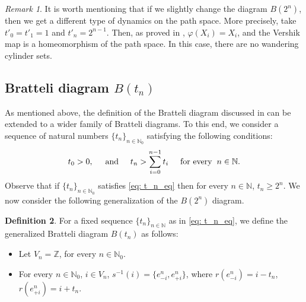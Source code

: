 \documentclass[11pt,reqno]{amsart}
\theoremstyle{definition}
\newtheorem{definition}{Definition}[section]
\theoremstyle{remark}
\newtheorem{remark}[definition]{Remark}
\theoremstyle{plain}
\newcommand{\N}{\mathbb N}
\newcommand{\Z}{\mathbb Z}
\numberwithin{equation}{section}
\begin{document}
\begin{remark} It is worth mentioning that if we slightly change 
the diagram $B(2^n)$, then we get a different type of dynamics on the path space. More precisely, take $t'_0 = t'_1 =1$ and $t'_n = 2^{n-1}$. Then, as proved in 
 \cite[Example 3.13]{BezuglyiJorgensenKarpelSanadhya2025}, $\varphi(X_i) = X_i$, and the Vershik map is a homeomorphism of the path space. In this case, there are no wandering cylinder sets. 
\end{remark}

\subsection{Bratteli diagram $B(t_n)$}

As mentioned above, the definition of the Bratteli diagram discussed in   can be extended to a wider family
of Bratteli diagrams. To this end, we consider a sequence of natural numbers $\{t_{n}\}_{n\in \N_0}$ satisfying the following conditions:
\begin{equation}\label{eq: t_n_eq}
    t_0 >0,\hspace{5mm} \mathrm{and} \hspace{5mm} t_n > \sum_{i=0}^{n-1} t_i \hspace{5mm} \mathrm{for \,\,every} \hspace{2mm} n \in \N.
\end{equation} Observe that if $\{t_{n}\}_{n\in \N_0}$ satisfies \eqref{eq: t_n_eq} then for every $n \in \N$, $t_n \geq 2^n$.  We now consider the following generalization of the $B(2^n)$ diagram.  

\begin{definition}\label{def:GBD_t_n}
For a fixed sequence $\{t_{n}\}_{n\in \N}$ as in \eqref{eq: t_n_eq}, we define the generalized Bratteli diagram $B(t_n)$ as follows: 
\begin{itemize}
    \item Let $V_n = \Z$, for every $n \in \N_0$. 

\item For every $n \in \N_0$, $i \in V_n$, $s^{-1} (i) = \{e_{-i}^n, e_{+i}^n\}$, where $r(e_{-i}^n) = i -t_n$, $r(e_{+i}^n) = i + t_n$.
\end{itemize}
    
\end{definition}
\end{document}

